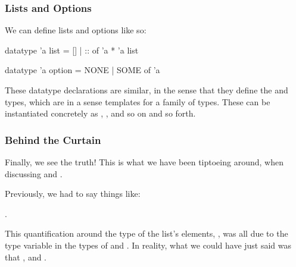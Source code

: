 \documentclass[aspectratio=169, handout]{beamer}
\begin{document}
\begin{frame}[fragile]
  \frametitle{Lists and Options}

  We can define lists and options like so:

  \begin{codeblock}
    datatype 'a list = [] | :: of 'a * 'a list

    datatype 'a option = NONE | SOME of 'a
  \end{codeblock}

  \pause
  \vspace{\fill}

  These datatype declarations are similar, in the sense that they define the
   and  types, which are in a sense templates for
  a family of types. These can be instantiated concretely as ,
  , and so on and so forth.

  \pause
  \vspace{\fill}

\end{frame}

\begin{frame}[fragile]
  \frametitle{Behind the Curtain}

  Finally, we see the truth! This is what we have been tiptoeing around, when
  discussing \code{[]} and \code{::}.

  \pause
  \vspace{\fill}

  Previously, we had to say things like:

  .

  \pause
  \vspace{\fill}

  This quantification around the type of the list's elements, , was all
  due to the type variable in the types of \code{[]} and \code{::}. In reality,
  what we could have just said was that , and
  .

\end{frame}
\end{document}
